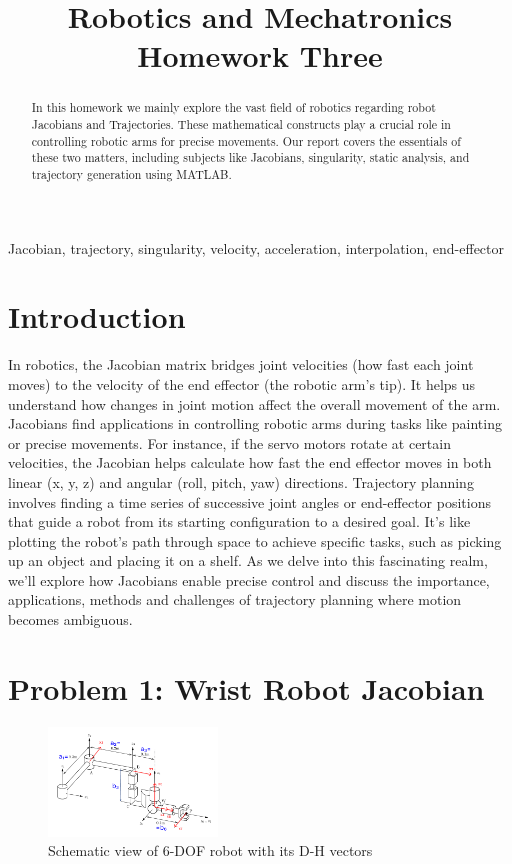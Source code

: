 \documentclass[conference]{IEEEtran}
\title{Robotics and Mechatronics\\
{\LARGE Homework Three}
}
\author{\IEEEauthorblockN{Mohammad Montazeri}
    \IEEEauthorblockA{\textit{School of Mechanical Engineering} \\
        \textit{College of Engineering, University of Tehran}\\
        Tehran, Iran; 810699269 \\
        mohammadmontazeri@ut.ac.ir}
}
\begin{document}
\maketitle

\begin{abstract}
    In this homework we mainly explore the vast field of robotics regarding robot Jacobians and Trajectories. These mathematical constructs play a crucial role in controlling robotic arms for precise movements. Our report covers the essentials of these two matters, including subjects like Jacobians, singularity, static analysis, and trajectory generation using MATLAB.
\end{abstract}

\begin{IEEEkeywords}
    Jacobian, trajectory, singularity, velocity, acceleration, interpolation, end-effector
\end{IEEEkeywords}

\section{Introduction}
In robotics, the Jacobian matrix bridges joint velocities (how fast each joint moves) to the velocity of the end effector (the robotic arm’s tip). It helps us understand how changes in joint motion affect the overall movement of the arm. Jacobians find applications in controlling robotic arms during tasks like painting or precise movements. For instance, if the servo motors rotate at certain velocities, the Jacobian helps calculate how fast the end effector moves in both linear (x, y, z) and angular (roll, pitch, yaw) directions. Trajectory planning involves finding a time series of successive joint angles or end-effector positions that guide a robot from its starting configuration to a desired goal. It's like plotting the robot's path through space to achieve specific tasks, such as picking up an object and placing it on a shelf. As we delve into this fascinating realm, we'll explore how Jacobians enable precise control and discuss the importance, applications, methods and challenges of trajectory planning where motion becomes ambiguous.

\section{Problem 1: Wrist Robot Jacobian}
\begin{figure}[htbp]
    \centerline{\includegraphics[width=0.4\textwidth]{figures/prob1.png}}
    \caption{Schematic view of 6-DOF robot with its D-H vectors}
    \label{fig:prob1}
\end{figure}
\end{document}
